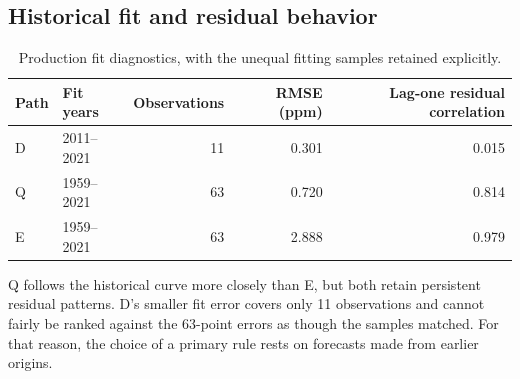 \documentclass[11pt,a4paper]{article}
\newcommand{\p}[2]{#2\par}
\newcommand{\txt}[2]{#2}
\begin{document}
\subsection{Historical fit and residual behavior}
\begin{table}[H]\centering\small
\caption{\txt{TC03}{Production fit diagnostics, with the unequal fitting samples retained explicitly.}}\label{tab:fit}
\begin{tabular}{llrrr}\toprule
Path & Fit years & Observations & RMSE (ppm) & Lag-one residual correlation\\\midrule
D & 2011--2021 & 11 & 0.301 & 0.015\\
Q & 1959--2021 & 63 & 0.720 & 0.814\\
E & 1959--2021 & 63 & 2.888 & 0.979\\\bottomrule
\end{tabular}
\end{table}
\p{CO209}{Q follows the historical curve more closely than E, but both retain persistent residual patterns. D's smaller fit error covers only 11 observations and cannot fairly be ranked against the 63-point errors as though the samples matched. For that reason, the choice of a primary rule rests on forecasts made from earlier origins.}
\end{document}
